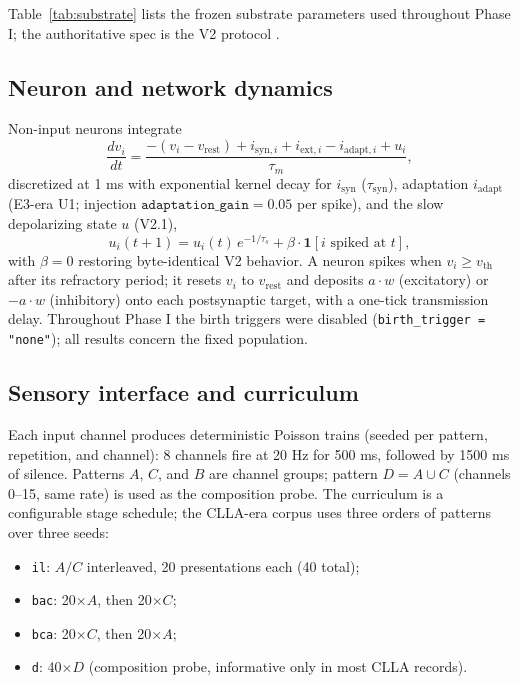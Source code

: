 Table~\ref{tab:substrate} lists the frozen substrate parameters used
throughout Phase I; the authoritative spec is the V2 protocol
\cite{v2proto,overview}.



\subsection{Neuron and network dynamics}

Non-input neurons integrate
\begin{equation}
  \frac{dv_i}{dt} = \frac{-(v_i - v_{\mathrm{rest}}) + i_{\mathrm{syn},i} + i_{\mathrm{ext},i}
     - i_{\mathrm{adapt},i} + u_i}{\tau_m},
  \label{eq:dv}
\end{equation}
discretized at 1 ms with exponential kernel decay for
\(i_{\mathrm{syn}}\) (\(\tau_{\mathrm{syn}}\)), adaptation
\(i_{\mathrm{adapt}}\) (E3-era U1; injection
\(\texttt{adaptation\_gain}=0.05\) per spike), and the slow depolarizing
state \(u\) (V2.1),
\begin{equation}
  u_i(t+1) = u_i(t)\, e^{-1/\tau_s} + \beta\cdot
  \mathbf{1}[i \text{ spiked at } t],
\end{equation}
with \(\beta=0\) restoring byte-identical V2 behavior. A neuron spikes
when \(v_i \ge v_{\mathrm{th}}\) after its refractory period; it resets
\(v_i\) to \(v_{\mathrm{rest}}\) and deposits \(a\cdot w\) (excitatory)
or \(-a\cdot w\) (inhibitory) onto each postsynaptic target, with a
one-tick transmission delay. Throughout Phase I the birth triggers were
disabled
(\texttt{birth\_trigger = "none"}); all results concern the fixed
population.

\subsection{Sensory interface and curriculum}

Each input channel produces deterministic Poisson trains (seeded per
pattern, repetition, and channel): 8 channels fire at 20 Hz for 500 ms,
followed by 1500 ms of silence. Patterns \(A\), \(C\), and \(B\) are
channel groups; pattern \(D = A \cup C\) (channels 0--15, same rate) is
used as the composition probe. The curriculum is a configurable stage
schedule; the CLLA-era corpus uses three orders of patterns over three
seeds:
\begin{itemize}
\item \texttt{il}: \(A/C\) interleaved, 20 presentations each (40 total);
\item \texttt{bac}: 20\(\times A\), then 20\(\times C\);
\item \texttt{bca}: 20\(\times C\), then 20\(\times A\);
\item \texttt{d}: 40\(\times D\) (composition probe, informative only
in most CLLA records).
\end{itemize}

